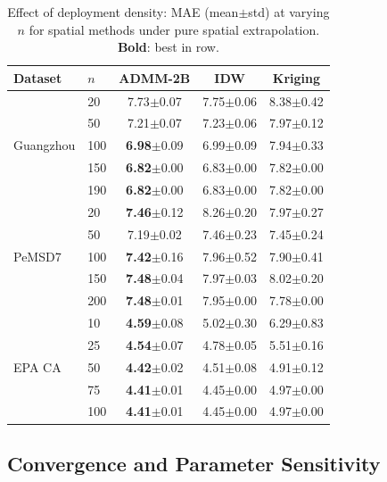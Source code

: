 \documentclass[journal]{IEEEtran}
\begin{document}
\begin{table}[htbp]
  \centering
  \caption{Effect of deployment density: MAE (mean$\pm$std) at varying $n$ for spatial methods under pure spatial extrapolation. \textbf{Bold}: best in row.}
  \label{tab:density}
  \small
  \setlength{\tabcolsep}{2pt}
  \begin{tabular}{llccc}
    \toprule
    Dataset & $n$ & ADMM-2B & IDW & Kriging \\
    \midrule
    \multirow{5}{*}{Guangzhou}
    & 20  & 7.73$\pm$0.07 & 7.75$\pm$0.06 & 8.38$\pm$0.42 \\
    & 50  & 7.21$\pm$0.07 & 7.23$\pm$0.06 & 7.97$\pm$0.12 \\
    & 100 & \textbf{6.98}$\pm$0.09 & 6.99$\pm$0.09 & 7.94$\pm$0.33 \\
    & 150 & \textbf{6.82}$\pm$0.00 & 6.83$\pm$0.00 & 7.82$\pm$0.00 \\
    & 190 & \textbf{6.82}$\pm$0.00 & 6.83$\pm$0.00 & 7.82$\pm$0.00 \\
    \midrule
    \multirow{5}{*}{PeMSD7}
    & 20  & \textbf{7.46}$\pm$0.12 & 8.26$\pm$0.20 & 7.97$\pm$0.27 \\
    & 50  & 7.19$\pm$0.02 & 7.46$\pm$0.23 & 7.45$\pm$0.24 \\
    & 100 & \textbf{7.42}$\pm$0.16 & 7.96$\pm$0.52 & 7.90$\pm$0.41 \\
    & 150 & \textbf{7.48}$\pm$0.04 & 7.97$\pm$0.03 & 8.02$\pm$0.20 \\
    & 200 & \textbf{7.48}$\pm$0.01 & 7.95$\pm$0.00 & 7.78$\pm$0.00 \\
    \midrule
    \multirow{5}{*}{EPA CA}
    & 10  & \textbf{4.59}$\pm$0.08 & 5.02$\pm$0.30 & 6.29$\pm$0.83 \\
    & 25  & \textbf{4.54}$\pm$0.07 & 4.78$\pm$0.05 & 5.51$\pm$0.16 \\
    & 50  & \textbf{4.42}$\pm$0.02 & 4.51$\pm$0.08 & 4.91$\pm$0.12 \\
    & 75  & \textbf{4.41}$\pm$0.01 & 4.45$\pm$0.00 & 4.97$\pm$0.00 \\
    & 100 & \textbf{4.41}$\pm$0.01 & 4.45$\pm$0.00 & 4.97$\pm$0.00 \\
    \bottomrule
  \end{tabular}
\end{table}

\subsection{Convergence and Parameter Sensitivity}\label{sec:results_q5}
\end{document}
